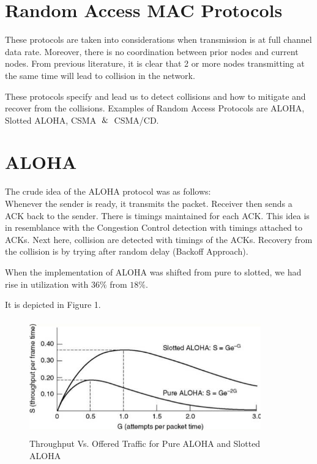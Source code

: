 \documentclass[12pt]{article}
\begin{document}
\maketitle

\section{Random Access MAC Protocols}
These protocols are taken into considerations when transmission is at full channel data rate. Moreover, there is no coordination between prior nodes and current nodes. From previous literature, it is clear that 2 or more nodes transmitting at the same time will lead to collision in the network.

These protocols specify and lead us to detect collisions and how to mitigate and recover from the collisions. Examples of Random Access Protocols are ALOHA, Slotted ALOHA, CSMA $\And$ CSMA/CD.


\section{ALOHA}
The crude idea of the ALOHA protocol was as follows: \\

Whenever the sender is ready, it transmits the packet. Receiver then sends a ACK back to the sender. There is timings maintained for each ACK. This idea is in resemblance with the Congestion Control detection with timings attached to ACKs. Next here, collision are detected with timings of the ACKs. Recovery from the collision is by trying after random delay (Backoff Approach).


When the implementation of ALOHA was shifted from pure to slotted, we had rise in utilization with $36\%$ from $18\%$.

It is depicted in Figure 1.

\begin{figure}
    \centering
    \includegraphics[width=10cm, height=5cm]{aloha.png}
    \caption{Throughput Vs. Offered Traffic for Pure ALOHA and Slotted ALOHA}
\end{figure}
\end{document}
